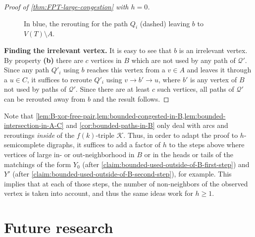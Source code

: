 \documentclass[a4paper,UKenglish,cleveref, autoref, thm-restate]{lipics-v2021}
\newcommand{\lipItem}[1]{\textcolor{lipicsGray}{\sffamily\bfseries\upshape\mathversion{bold}#1}}
\DeclareMathOperator{\Mat}{\mathsf M}
\begin{document}
\begin{proof}[Proof of \autoref{thm:FPT-large-congestion} with $h = 0$]
\begin{figure}[h]
  \caption{In blue, the rerouting for the path $Q_i$ (dashed) leaving $b$ to $V(T) \setminus A$.}
  \label{fig:rerouting-for-b-in-X}
\end{figure}



\medskip
\noindent\textbf{Finding the irrelevant vertex.}
It is easy to see that $b$ is an irrelevant vertex.
By property \lipItem{(b)} there are $c$ vertices in $B$ which are not used by any path of $\mathcal{Q}'$.
Since any path $Q'_i$ using $b$ reaches this vertex from a $v \in A$ and leaves it through a $u \in C$, it suffices to reroute $Q'_i$ using $v \to b' \to u$, where $b'$ is any vertex of $B$ not used by paths of $\mathcal{Q}'$.
Since there are at least $c$ such vertices, all paths of $\mathcal{Q}'$ can be rerouted away from $b$ and the result follows.
\end{proof}

Note that \cref{lem:B-xor-free-pair,lem:bounded-congested-in-B,lem:bounded-intersection-in-A-C} and \autoref{cor:bounded-paths-in-B} only deal with arcs and reroutings {\sl inside} of the $f(k)$-triple $\mathcal{K}$.
Thus, in order to adapt the proof to $h$-semicomplete digraphs, it suffices to add a factor of $h$ to the steps above where vertices of large in- or out-neighborhood in $B$ or in the heads or tails of the matchings of the form $Y_0$ (after \autoref{claim:bounded-used-outside-of-B-first-step}) and $Y'$ (after \autoref{claim:bounded-used-outside-of-B-second-step}), for example.
This implies that at each of those steps, the number of non-neighbors of the observed vertex is taken into account, and thus the same ideas work for $h \geq 1$. \section{Future research}
\label{sec:conclusions}
\end{document}
